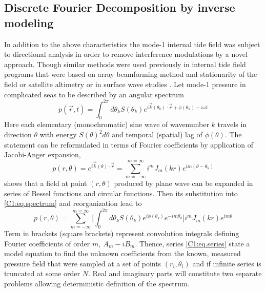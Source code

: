 \documentclass[12pt]{article}
\begin{document}
\subsection{Discrete Fourier Decomposition by inverse modeling}
In addition to the above characteristics the mode-1 internal tide field was subject to directional 
analysis in order to remove interference modulations by a novel approach. Though similar methods 
were used previously in internal tide field programs \citep{hendry1977observations, 
lozovatsky2003spatial} that were based on array beamforming method and stationarity of the field or 
satellite altimetry \citep{dushaw2002mapping} or in surface wave studies 
\citep{longuet1961observations, munk1963directional, long1986inverse}. Let 
mode-1 pressure in complicated seas to be described by an angular spectrum
\begin{equation}
\label{C1:eq.spectrum}
p(\vec{r}, t) = \int_0^{2\pi}  d\theta_k S(\theta_k) e^{i \vec{k}(\theta_k) \cdot \vec{r} + 
\phi(\theta_k) - i \omega t}
\end{equation}
Here each elementary (monochromatic) sine wave of wavenumber $k$ travels in direction $\theta$ with 
energy $S(\theta)^2 d\theta$ and temporal (spatial) lag of $\phi(\theta)$. The statement can be 
reformulated in terms of Fourier coefficients \citep{munk1963directional} by application of 
Jacobi-Anger expansion,
\begin{equation}
p(r, \theta) = e^{i \vec{k}(\theta) \cdot \vec{r}} = \sum_{m = -\infty}^{m = \infty} i^{m} J_{m}(k 
r) e^{im(\theta - \theta_k)}
\end{equation}
shows that a field at point $(r, \theta)$ produced by plane wave can be expanded in series of 
Bessel functions and circular functions. Then its substitution into \eqref{C1:eq.spectrum} and 
reorganization lead to
\begin{equation}
\label{C1:eq.series}
p(r, \theta) = \sum_{m=-\infty}^{m=\infty} \big[ \int_0^{2\pi}  d\theta_k S(\theta_k) 
e^{i\phi(\theta_k)} e^{-im\theta_k} \big] i^m J_m(kr) e^{im\theta}
\end{equation}
Term in brackets (square brackets) represent convolution integrals defining Fourier coefficients of 
order $m,~A_m - i B_m$. Thence, series \eqref{C1:eq.series} state a model equation to find the 
unknown coefficients from the known, measured pressure field that were sampled at a set of points 
$(r_i, \theta_i)$ and if infinite series is truncated at some order $N$. Real and imaginary parts 
will constitute two separate problems allowing deterministic definition of the spectrum.\\
\end{document}
